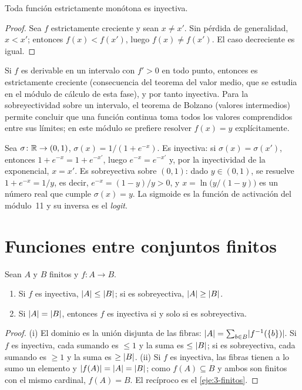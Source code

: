 \begin{proposicion}\label{prop:t3-monotona}
Toda función estrictamente monótona es inyectiva.
\end{proposicion}

\begin{proof}
Sea $f$ estrictamente creciente y sean $x\neq x'$. Sin pérdida de generalidad, $x<x'$; entonces $f(x)<f(x')$, luego $f(x)\neq f(x')$. El caso decreciente es igual.
\end{proof}

Si $f$ es derivable en un intervalo con $f'>0$ en todo punto, entonces es estrictamente creciente (consecuencia del teorema del valor medio, que se estudia en el módulo de cálculo de esta fase), y por tanto inyectiva. Para la sobreyectividad sobre un intervalo, el teorema de Bolzano (valores intermedios) permite concluir que una función continua toma todos los valores comprendidos entre sus límites; en este módulo se prefiere resolver $f(x)=y$ explícitamente.

\begin{ejemplo}[La sigmoide]\label{ej:t3-sigmoide}
Sea $\sigma\colon\mathbb{R}\to(0,1)$, $\sigma(x)=1/(1+e^{-x})$. Es inyectiva: si $\sigma(x)=\sigma(x')$, entonces $1+e^{-x}=1+e^{-x'}$, luego $e^{-x}=e^{-x'}$ y, por la inyectividad de la exponencial, $x=x'$. Es sobreyectiva sobre $(0,1)$: dado $y\in(0,1)$, se resuelve $1+e^{-x}=1/y$, es decir, $e^{-x}=(1-y)/y>0$, y $x=\ln\bigl(y/(1-y)\bigr)$ es un número real que cumple $\sigma(x)=y$. La sigmoide es la función de activación del módulo~11 y su inversa es el \emph{logit}.
\end{ejemplo}

\section{Funciones entre conjuntos finitos}

\begin{proposicion}\label{prop:t3-finitos}
Sean $A$ y $B$ finitos y $f\colon A\to B$.
\begin{enumerate}
  \item Si $f$ es inyectiva, $\lvert A\rvert\le\lvert B\rvert$; si es sobreyectiva, $\lvert A\rvert\ge\lvert B\rvert$.
  \item Si $\lvert A\rvert=\lvert B\rvert$, entonces $f$ es inyectiva si y solo si es sobreyectiva.
\end{enumerate}
\end{proposicion}

\begin{proof}
(i) El dominio es la unión disjunta de las fibras: $\lvert A\rvert=\sum_{b\in B}\lvert f^{-1}(\{b\})\rvert$. Si $f$ es inyectiva, cada sumando es $\le1$ y la suma es $\le\lvert B\rvert$; si es sobreyectiva, cada sumando es $\ge1$ y la suma es $\ge\lvert B\rvert$. (ii) Si $f$ es inyectiva, las fibras tienen a lo sumo un elemento y $\lvert f(A)\rvert=\lvert A\rvert=\lvert B\rvert$; como $f(A)\subseteq B$ y ambos son finitos con el mismo cardinal, $f(A)=B$. El recíproco es el \cref{eje:3-finitos}.
\end{proof}

